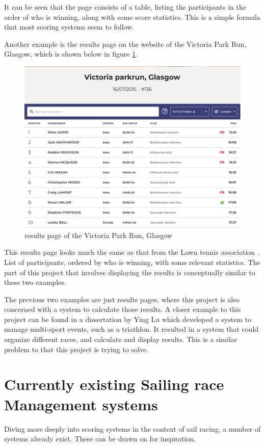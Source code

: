 \documentclass{l4proj}
\begin{document}
It can be seen that the page consists of a table, listing the participants in the order of who is winning, along with some score statistics. This is a simple formula that most scoring systems seem to follow.

Another example is the results page on the website of the Victoria Park Run, Glasgow, which is shown below in figure \ref{fig:parkrun}.

\begin{figure}[h!]
    \centering
    \includegraphics[width=0.6\linewidth]{images/ParkRun.png} 

    \caption{results page of the Victoria Park Run, Glasgow \citep{Parkrun}
    }

    \label{fig:parkrun} 
\end{figure}

This results page looks much the same as that from the Lawn tennis association \citet{Tennis}. List of participants, ordered by who is winning, with some relevant statistics. The part of this project that involves displaying the results is conceptually similar to these two examples.

The previous two examples are just results pages, where this project is also concerned with a system to calculate those results. A closer example to this project can be found in a dissertation by Ying Lu \citet{Multi-sport} which developed a system to manage multi-sport events, such as a triathlon. It resulted in a system that could organize different races, and calculate and display results. This is a similar problem to that this project is trying to solve.

\section{Currently existing Sailing race Management systems}
Diving more deeply into scoring systems in the context of sail racing, a number of systems already exist. These can be drawn on for inspiration.
\end{document}

